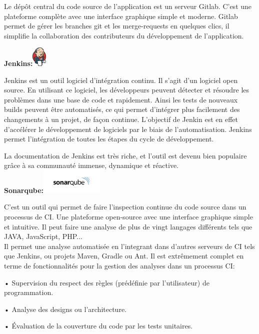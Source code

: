 \documentclass[12pt]{article}
\begin{document}
Le dépôt central du code source de l’application est un serveur Gitlab. C’est une plateforme complète avec une interface graphique simple et moderne. Gitlab permet de gérer les branches git et les merge-requests en quelques clics, il simplifie la collaboration des contributeurs du développement de l’application. 

\textbf{Jenkins:}\includegraphics[width=7mm,scale=0.5]{diagrammes/jenkins.png}

Jenkins est un outil logiciel d’intégration continu. Il s’agit d’un logiciel open source. En utilisant ce logiciel, les développeurs peuvent détecter et résoudre les problèmes dans une base de code et rapidement. Ainsi les tests de nouveaux builds peuvent être automatisés, ce qui permet d’intégrer plus facilement des changements à un projet, de façon continue. L’objectif de Jenkin est en effet d’accélérer le développement de logiciels par le biais de l’automatisation. Jenkins permet l’intégration de toutes les étapes du cycle de développement.


La documentation de Jenkins est très riche, et l’outil est devenu bien populaire grâce à sa communauté immense, dynamique et réactive.\\
\newpage
\textbf{Sonarqube:}\includegraphics[width=30mm,scale=0.5]{diagrammes/sonarqube.png}

C’est un outil qui permet de faire l’inspection continue du code source dans un processus de CI. Une plateforme open-source avec une interface graphique simple et intuitive. Il peut faire une analyse de plus de vingt langages différents tels que JAVA, JavaScript, PHP...\\
Il permet une analyse automatisée en l’integrant dans d’autres serveurs de CI tels que Jenkins, ou projets Maven, Gradle ou Ant. Il est extrêmement complet en terme de fonctionnalités pour la gestion des analyses dans un processus CI:

• Supervision du respect des règles (prédéfinie par l’utilisateur) de programmation.

• Analyse des designs ou l’architecture.

• Évaluation de la couverture du code par les tests unitaires.
\end{document}
